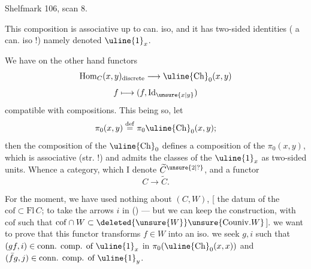 Shelfmark 106, scan 8.

This composition is associative up to can. iso, and it has two-sided identities ( a can. iso !) namely
 denoted $\uline{1}_x$.

We have on the other hand  functors
\[\operatorname{Hom}_C(x,y)_{\text{discrete}}\longrightarrow\uline{\mathrm{Ch}}_0(x,y)\]
\[f\longmapsto(f,\operatorname{Id}_{\unsure{x|y}})\]
compatible with compositions. This being so, let
\[\pi_0(x,y)\overset{\mathrm{def}}=\pi_0\uline{\mathrm{Ch}}_0(x,y);\]
then the composition of the $\uline{\mathrm{Ch}}_0$ defines a composition of the $\pi_0(x,y)$, which is associative (str. !) and admits the classes of the $\uline{1}_x$ as two-sided units. Whence a category, which I denote $\widetilde C^{\unsure{2|?}}$, and a functor
\[C\longrightarrow\widetilde C.\]

For the moment, we have used nothing about $(C,W)$, [  the datum of the $\mathrm{cof}\subset\mathrm{Fl}\,C$;  to take the arrows $i$ in () --- but  we can keep the construction, with $\mathrm{cof}$  such that $\mathrm{cof}\cap W\subset\deleted{\unsure{W}}\unsure{\mathrm{Couniv.}W}$].   we want to prove that this functor transforms $f\in W$ into an iso.
we seek $g,i$ such that $(gf,i)\in\text{conn. comp. of }\uline{1}_x$ in $\pi_0(\uline{\mathrm{Ch}}_0(x,x))$ and $(\bar f g,j)\in\text{conn. comp. of }\uline{1}_y$.
